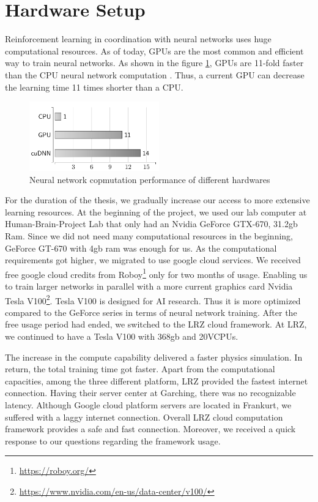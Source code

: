 \section{Hardware Setup}

Reinforcement learning in coordination with neural networks uses huge computational resources. As of today, GPUs are the most common and efficient way to train neural networks. As shown in the figure \ref{fig:cpuvsgpu}, GPUs are 11-fold faster than the CPU neural network computation \cite{Schlegel2015}. Thus, a current GPU can decrease the learning time 11 times shorter than a CPU. 

\begin{figure}[htbp]
    \centering
    \includegraphics[width=0.5\textwidth]{figures/cpuvsgpu}
    \caption{ Neural network copmutation performance of different hardwares}
    \label{fig:cpuvsgpu}
\end{figure}

For the duration of the thesis, we gradually increase our access to more extensive learning resources. At the beginning of the project, we used our lab computer at Human-Brain-Project Lab that only had an Nvidia GeForce GTX-670, 31.2gb Ram. Since we did not need many computational resources in the beginning, GeForce GT-670 with 4gb ram was enough for us. As the computational requirements got higher, we migrated to use google cloud services. We received free google cloud credits from Roboy\footnote{\url{https://roboy.org/}} only for two months of usage. Enabling us to train larger networks in parallel with a more current graphics card Nvidia Tesla V100\footnote{\url{https://www.nvidia.com/en-us/data-center/v100/}}. Tesla V100 is designed for AI research. Thus it is more optimized compared to the GeForce series in terms of neural network training. After the free usage period had ended, we switched to the LRZ cloud framework. At LRZ, we continued to have a Tesla V100 with 368gb and 20VCPUs. 

The increase in the compute capability delivered a faster physics simulation. In return, the total training time got faster. Apart from the computational capacities, among the three different platform, LRZ provided the fastest internet connection. Having their server center at Garching, there was no recognizable latency. Although Google cloud platform servers are located in Frankurt, we suffered with a laggy internet connection. 
Overall LRZ cloud computation framework provides a safe and fast connection. Moreover, we received a quick response to our questions regarding the framework usage.


